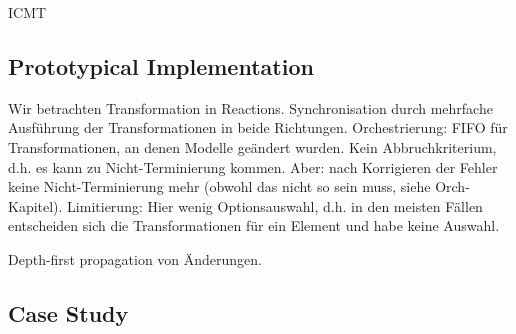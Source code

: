 \begin{copiedFrom}{ICMT}
\subsection{Prototypical Implementation}


Wir betrachten Transformation in Reactions.
Synchronisation durch mehrfache Ausführung der Transformationen in beide Richtungen.
Orchestrierung: FIFO für Transformationen, an denen Modelle geändert wurden. Kein Abbruchkriterium, d.h. es kann zu Nicht-Terminierung kommen. Aber: nach Korrigieren der Fehler keine Nicht-Terminierung mehr (obwohl das nicht so sein muss, siehe Orch-Kapitel). Limitierung: Hier wenig Optionsauswahl, d.h. in den meisten Fällen entscheiden sich die Transformationen für ein Element und habe keine Auswahl.

Depth-first propagation von Änderungen.


\subsection{Case Study}


\end{copiedFrom}
